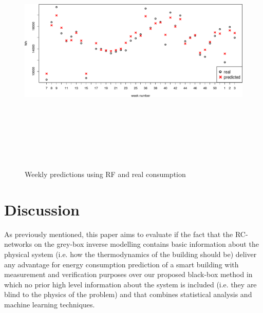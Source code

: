 \documentclass[10pt, conference, compsocconf]{IEEEtran}
\begin{document}
\begin{figure}[t!]\label{fig:weekly}%
\centering
\centerline{\includegraphics[width=12cm,height=12cm,keepaspectratio]{./pics/weekly.pdf}}
\caption{Weekly predictions using RF and real consumption}\vspace*{-6pt}
  \label{fig:weekly}
\end{figure}

\section{Discussion}

As previously mentioned, this paper aims to evaluate if the fact that the RC-networks on the grey-box inverse modelling contains basic information about the physical system (i.e. how the thermodynamics of the building should be) deliver any advantage for energy consumption prediction of a smart building with measurement and verification purposes over our proposed black-box method in which no prior high level information about the system is included (i.e. they are blind to the physics of the problem) and that combines statistical analysis and machine learning techniques. %

\end{document}
